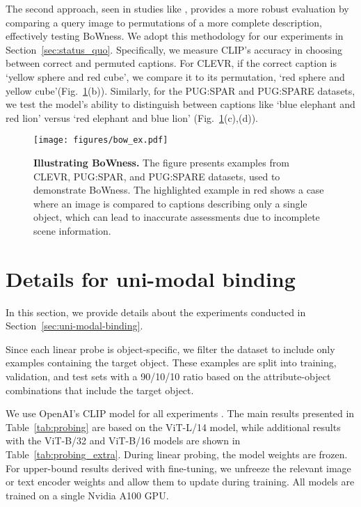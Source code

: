 The second approach, seen in studies like \cite{Yuksekgonul2023}, provides a more robust evaluation by comparing a query image to permutations of a more complete description, effectively testing BoWness. We adopt this methodology for our experiments in Section~\ref{sec:status_quo}. Specifically, we measure CLIP's accuracy in choosing between correct and permuted captions. For CLEVR, if the correct caption is `yellow sphere and red cube', we compare it to its permutation, `red sphere and yellow cube'(Fig.~\ref{fig:bow_ex}(b)). Similarly, for the PUG:SPAR and PUG:SPARE datasets, we test the model's ability to distinguish between captions like `blue elephant and red lion' versus `red elephant and blue lion' (Fig.~\ref{fig:bow_ex}(c),(d)).
\begin{figure}[]
  \centering
   \texttt{[image: figures/bow\_ex.pdf]}
   \caption{\textbf{Illustrating BoWness.} The figure presents examples from CLEVR, PUG:SPAR, and PUG:SPARE datasets, used to demonstrate BoWness. The highlighted example in red shows a case where an image is compared to captions describing only a single object, which can lead to inaccurate assessments due to incomplete scene information.}
   \label{fig:bow_ex}
\end{figure}

\section{Details for uni-modal binding}
\label{sec:probing_details}

In this section, we provide details about the experiments conducted in Section~\ref{sec:uni-modal-binding}. 

Since each linear probe is object-specific, we filter the dataset to include only examples containing the target object. These examples are split into training, validation, and test sets with a 90/10/10 ratio based on the attribute-object combinations that include the target object.

We use OpenAI's CLIP model for all experiments \cite{radford2021learning}. The main results presented in Table~\ref{tab:probing} are based on the ViT-L/14 model, while additional results with the ViT-B/32 and ViT-B/16 models are shown in Table~\ref{tab:probing_extra}. During linear probing, the model weights are frozen. For upper-bound results derived with fine-tuning, we unfreeze the relevant image or text encoder weights and allow them to update during training. All models are trained on a single Nvidia A100 GPU.

